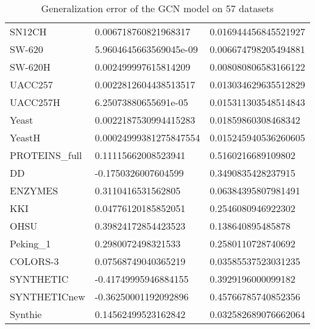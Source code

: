\begin{table}[!ht]
\begin{tabular}{p{3.5cm}|p{5cm}p{5cm}}
        SN12CH & 0.006718760821968317 & 0.016944456845521927 \\
        SW-620 & 5.9604645663569045e-09 & 0.006674798205494881 \\
        SW-620H & 0.002499997615814209 & 0.008080806583166122 \\
        UACC257 & 0.0022812604438513517 & 0.013034629635512829 \\
        UACC257H & 6.25073880655691e-05 & 0.015311303548514843 \\
        Yeast & 0.0022187530994415283 & 0.01859860308468342 \\
        YeastH & 0.00024999381275847554 & 0.015245940536260605 \\
        PROTEINS\_full & 0.11115662008523941 & 0.5160216689109802 \\
        DD & -0.1750326007604599 & 0.3490835428237915 \\
        ENZYMES & 0.3110416531562805 & 0.06384395807981491 \\
        KKI & 0.04776120185852051 & 0.2546080946922302 \\
        OHSU & 0.39824172854423523 & 0.138640895485878 \\
        Peking\_1 & 0.2980072498321533 & 0.2580110728740692 \\
        COLORS-3 & 0.07568749040365219 & 0.03585537523031235 \\
        SYNTHETIC & -0.41749995946884155 & 0.3929196000099182 \\
        SYNTHETICnew & -0.36250001192092896 & 0.45766785740852356 \\
        Synthie & 0.14562499523162842 & 0.032582689076662064 \\ 
        \bottomrule
    \end{tabular}
    \caption{Generalization error of the GCN model on 57 datasets}
    \label{tab:ge_gcn} %
\end{table}